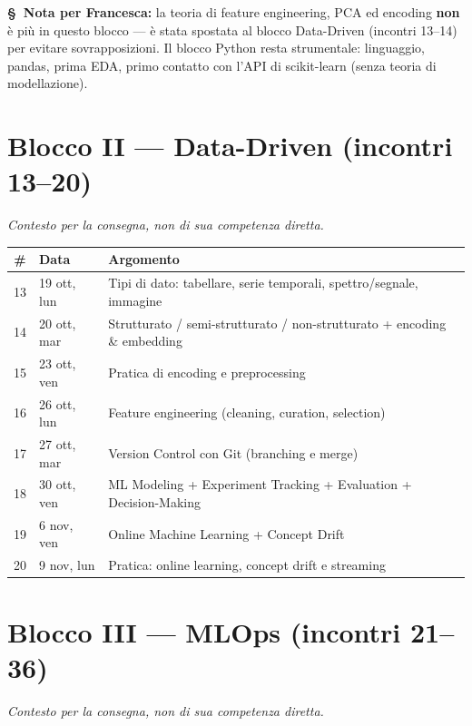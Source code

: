 \documentclass[11pt,a4paper]{article}
\newcommand{\flag}[1]{{\small\color{coursegold}\bfseries \S\ #1}}
\begin{document}
\vspace{0.4em}
\flag{Nota per Francesca:} la teoria di feature engineering, PCA ed encoding \textbf{non} è più in questo blocco --- è stata spostata al blocco Data-Driven (incontri 13--14) per evitare sovrapposizioni. Il blocco Python resta strumentale: linguaggio, pandas, prima EDA, primo contatto con l'API di scikit-learn (senza teoria di modellazione).

\section{Blocco II --- Data-Driven (incontri 13--20)}
\textit{Contesto per la consegna, non di sua competenza diretta.}

\begin{center}
\begin{tabularx}{\textwidth}{@{}c l X@{}}
\toprule
\textbf{\#} & \textbf{Data} & \textbf{Argomento} \\
\midrule
13 & 19 ott, lun & Tipi di dato: tabellare, serie temporali, spettro/segnale, immagine \\
14 & 20 ott, mar & Strutturato / semi-strutturato / non-strutturato + encoding \& embedding \\
15 & 23 ott, ven & Pratica di encoding e preprocessing \\
16 & 26 ott, lun & Feature engineering (cleaning, curation, selection) \\
17 & 27 ott, mar & Version Control con Git (branching e merge) \\
18 & 30 ott, ven & ML Modeling + Experiment Tracking + Evaluation + Decision-Making \\
19 & 6 nov, ven & Online Machine Learning + Concept Drift \\
20 & 9 nov, lun & Pratica: online learning, concept drift e streaming \\
\bottomrule
\end{tabularx}
\end{center}

\section{Blocco III --- MLOps (incontri 21--36)}
\textit{Contesto per la consegna, non di sua competenza diretta.}
\end{document}
